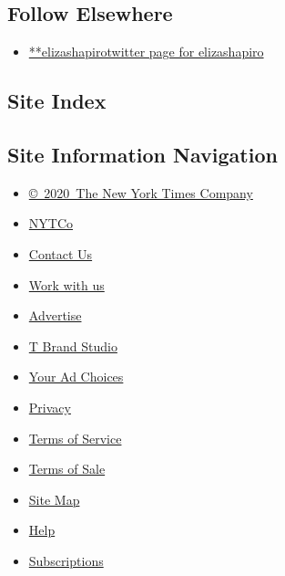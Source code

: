 \hypertarget{follow-elsewhere}{%
\subsection{Follow Elsewhere}\label{follow-elsewhere}}

\begin{itemize}
\tightlist
\item
  \href{https://twitter.com/elizashapiro}{**elizashapirotwitter page for
  elizashapiro}
\end{itemize}

\hypertarget{site-index}{%
\subsection{Site Index}\label{site-index}}

\hypertarget{site-information-navigation}{%
\subsection{Site Information
Navigation}\label{site-information-navigation}}

\begin{itemize}
\tightlist
\item
  \href{https://help.nytimes3xbfgragh.onion/hc/en-us/articles/115014792127-Copyright-notice}{©~2020~The
  New York Times Company}
\end{itemize}

\begin{itemize}
\tightlist
\item
  \href{https://www.nytco.com/}{NYTCo}
\item
  \href{https://help.nytimes3xbfgragh.onion/hc/en-us/articles/115015385887-Contact-Us}{Contact
  Us}
\item
  \href{https://www.nytco.com/careers/}{Work with us}
\item
  \href{https://nytmediakit.com/}{Advertise}
\item
  \href{http://www.tbrandstudio.com/}{T Brand Studio}
\item
  \href{https://www.nytimes3xbfgragh.onion/privacy/cookie-policy\#how-do-i-manage-trackers}{Your
  Ad Choices}
\item
  \href{https://www.nytimes3xbfgragh.onion/privacy}{Privacy}
\item
  \href{https://help.nytimes3xbfgragh.onion/hc/en-us/articles/115014893428-Terms-of-service}{Terms
  of Service}
\item
  \href{https://help.nytimes3xbfgragh.onion/hc/en-us/articles/115014893968-Terms-of-sale}{Terms
  of Sale}
\item
  \href{https://spiderbites.nytimes3xbfgragh.onion}{Site Map}
\item
  \href{https://help.nytimes3xbfgragh.onion/hc/en-us}{Help}
\item
  \href{https://www.nytimes3xbfgragh.onion/subscription?campaignId=37WXW}{Subscriptions}
\end{itemize}
